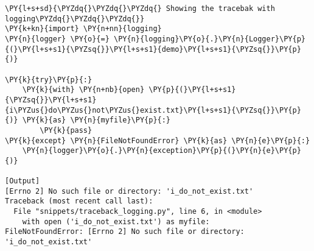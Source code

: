 \begin{Verbatim}[label=\makebox{\url{https://github.com/lucabaldini/cmepda/tree/master/slides/latex/snippets/traceback\_logging.py}},commandchars=\\\{\}]
\PY{l+s+sd}{\PYZdq{}\PYZdq{}\PYZdq{} Showing the tracebak with logging\PYZdq{}\PYZdq{}\PYZdq{}}
\PY{k+kn}{import} \PY{n+nn}{logging}
\PY{n}{logger} \PY{o}{=} \PY{n}{logging}\PY{o}{.}\PY{n}{Logger}\PY{p}{(}\PY{l+s+s1}{\PYZsq{}}\PY{l+s+s1}{demo}\PY{l+s+s1}{\PYZsq{}}\PY{p}{)}

\PY{k}{try}\PY{p}{:}
    \PY{k}{with} \PY{n+nb}{open} \PY{p}{(}\PY{l+s+s1}{\PYZsq{}}\PY{l+s+s1}{i\PYZus{}do\PYZus{}not\PYZus{}exist.txt}\PY{l+s+s1}{\PYZsq{}}\PY{p}{)} \PY{k}{as} \PY{n}{myfile}\PY{p}{:}
        \PY{k}{pass}
\PY{k}{except} \PY{n}{FileNotFoundError} \PY{k}{as} \PY{n}{e}\PY{p}{:}
    \PY{n}{logger}\PY{o}{.}\PY{n}{exception}\PY{p}{(}\PY{n}{e}\PY{p}{)}

[Output]
[Errno 2] No such file or directory: 'i_do_not_exist.txt'
Traceback (most recent call last):
  File "snippets/traceback_logging.py", line 6, in <module>
    with open ('i_do_not_exist.txt') as myfile:
FileNotFoundError: [Errno 2] No such file or directory: 'i_do_not_exist.txt'
\end{Verbatim}